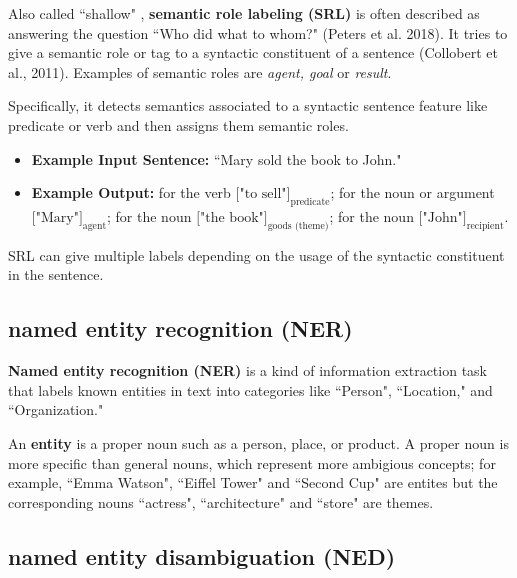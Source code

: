 Also called ``shallow"  , \textbf{semantic role labeling (SRL)} is often described as answering the question ``Who did what to whom?" (Peters et al. 2018). It tries to give a semantic role or tag to a syntactic constituent of a sentence (Collobert et al., 2011).  Examples of semantic roles are \emph{agent, goal} or \emph{result}. 

Specifically, it detects semantics associated to a syntactic sentence feature like predicate or verb and then assigns them semantic roles. 
\begin{itemize}
    \item \textbf{Example Input Sentence: } ``Mary sold the book to John."
    
    \item \textbf{Example Output: } for the verb $\Big[ \text{"to sell"}\Big]_\text{predicate}$; for the noun or argument $\Big[ \text{"Mary"}\Big]_\text{agent}$; for the noun $\Big[ \text{"the book"}\Big]_\text{goods (theme)}$; for the noun $\Big[ \text{"John"}\Big]_\text{recipient}$.
\end{itemize}

SRL can give multiple labels depending on the usage of the syntactic constituent in the sentence. 



\subsection{named entity recognition (NER)} \label{nlptask:namedentityrecognitionNER}

\textbf{Named entity recognition (NER)} is a kind of information extraction task that labels known entities in text into categories like ``Person", ``Location," and ``Organization." \newline 

An \textbf{entity} is a proper noun such as a person, place, or product. A proper noun is more specific than general nouns, which represent more ambigious concepts; for example, ``Emma Watson", ``Eiffel Tower" and ``Second Cup" are entites but the corresponding nouns ``actress", ``architecture" and ``store" are themes.



\subsection{named entity disambiguation (NED)} \label{nlptask:namedentitydisambiguationNED}

